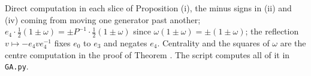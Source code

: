 Direct computation in each slice of Proposition (i), the minus signs in (ii) and (iv) coming from moving one generator past another; $e_{4}\cdot\tfrac{1}{2}(1 \pm \omega) = \pm P^{-1}\cdot\tfrac{1}{2}(1 \pm \omega)$ since $\omega(1 \pm \omega) = \pm(1 \pm \omega)$; the reflection $v \mapsto -e_{4}ve_{4}^{-1}$ fixes $e_{0}$ to $e_{3}$ and negates $e_{4}$. Centrality and the squares of $\omega$ are the centre computation in the proof of Theorem . The script computes all of it in \texttt{GA.py}.

